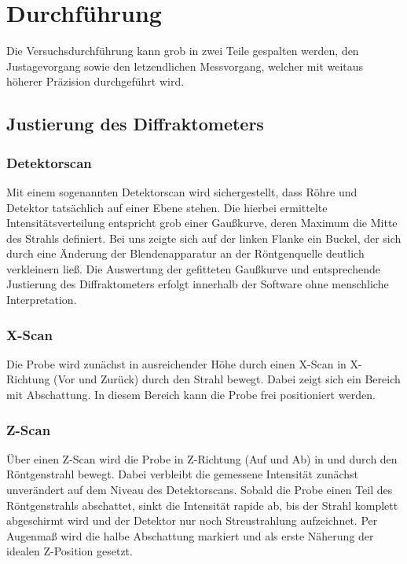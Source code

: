 \documentclass[12pt]{article}
\begin{document}
\section{Durchführung}\label{sec:durchfuehrung}
Die Versuchsdurchführung kann grob in zwei Teile gespalten werden, den Justagevorgang sowie den letzendlichen Messvorgang, welcher mit weitaus höherer Präzision durchgeführt wird.
\subsection{Justierung des Diffraktometers}
\subsubsection{Detektorscan}
Mit einem sogenannten Detektorscan wird sichergestellt, dass Röhre und Detektor tatsächlich auf einer Ebene stehen. Die hierbei ermittelte Intensitätsverteilung entspricht grob einer Gaußkurve, deren Maximum die Mitte des Strahls definiert. Bei uns zeigte sich auf der linken Flanke ein Buckel, der sich durch eine Änderung der Blendenapparatur an der Röntgenquelle deutlich verkleinern ließ. Die Auswertung der gefitteten Gaußkurve und entsprechende Justierung des Diffraktometers erfolgt innerhalb der Software ohne menschliche Interpretation.
\subsubsection{X-Scan}
Die Probe wird zunächst in ausreichender Höhe durch einen X-Scan in X-Richtung (Vor und Zurück) durch den Strahl bewegt. Dabei zeigt sich ein Bereich mit Abschattung. In diesem Bereich kann die Probe frei positioniert werden.
\subsubsection{Z-Scan}
Über einen Z-Scan wird die Probe in Z-Richtung (Auf und Ab) in und durch den Röntgenstrahl bewegt. Dabei verbleibt die gemessene Intensität zunächst unverändert auf dem Niveau des Detektorscans. Sobald die Probe einen Teil des Röntgenstrahls abschattet, sinkt die Intensität rapide ab, bis der Strahl komplett abgeschirmt wird und der Detektor nur noch Streustrahlung aufzeichnet. Per Augenmaß wird die halbe Abschattung markiert und als erste Näherung der idealen Z-Position gesetzt.
\end{document}
